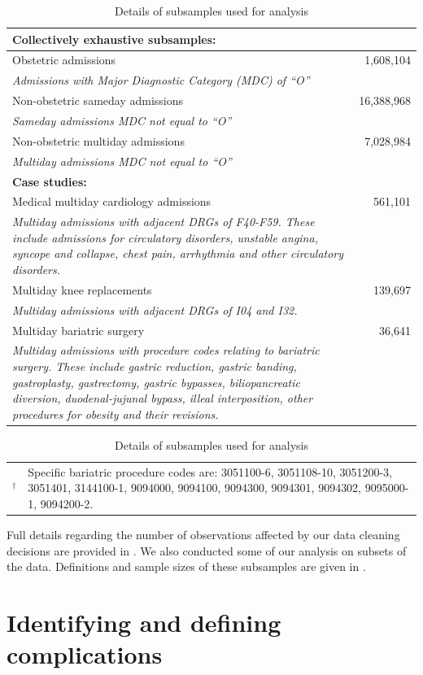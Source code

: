 \documentclass[submission]{grattan}
\begin{document}
\begin{table}
\caption{Details of subsamples used for analysis}\label{tbl:details-of-subsamples-used-for-analysis}
\begin{tabularx}{\linewidth}{Xr}
\toprule
\textbf{Collectively exhaustive subsamples:} &\tabularnewline
\midrule
Obstetric admissions & 1,608,104\tabularnewline
\textit{Admissions with Major Diagnostic Category (MDC) of ``O''} & \tabularnewline
Non-obstetric sameday admissions & 16,388,968\tabularnewline
\textit{Sameday admissions MDC not equal to ``O''} &\tabularnewline
Non-obstetric multiday admissions & 7,028,984\tabularnewline 
\textit{Multiday admissions MDC not equal to ``O''} &\tabularnewline
\textbf{Case studies:} &\tabularnewline
\midrule
Medical multiday cardiology admissions & 561,101\tabularnewline
\textit{Multiday admissions with adjacent DRGs of F40-F59.
These include admissions for circulatory disorders, unstable angina, syncope and collapse, chest pain, arrhythmia and other circulatory disorders.} &\tabularnewline
Multiday knee replacements & 139,697\tabularnewline
\textit{Multiday admissions with adjacent DRGs of I04 and I32.} &\tabularnewline
Multiday bariatric surgery & 36,641\tabularnewline
\textit{Multiday admissions with procedure codes relating to bariatric surgery.
These include gastric reduction, gastric banding, gastroplasty, gastrectomy, gastric bypasses, biliopancreatic diversion, duodenal-jujunal bypass, illeal interposition, other procedures for obesity and their revisions.} &\tabularnewline
\bottomrule
\end{tabularx}
\begin{tabularx}{\linewidth}{l@{}X}
{\footnotesize \({}^\dag\)} & {\footnotesize Specific bariatric procedure codes are: 3051100-6, 3051108-10, 3051200-3, 3051401, 3144100-1, 9094000, 9094100, 9094300, 9094301, 9094302, 9095000-1, 9094200-2.}
\end{tabularx}
\end{table}

Full details regarding the number of observations affected by our data cleaning decisions are provided in .
We also conducted some of our analysis on subsets of the data.
Definitions and sample sizes of these subsamples are given in .

\section{Identifying and defining complications}\label{sec:identifying-and-defining-complications}
\end{document}
